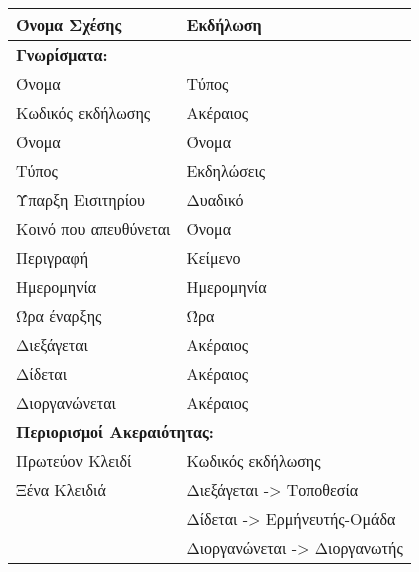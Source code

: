 \begin{tabular}{|p{6cm}|p{8cm}|}
  \hline
  Όνομα Σχέσης          & Εκδήλωση                         \\ \hline
  \multicolumn{2}{|l|}{\textbf{Γνωρίσματα:}}               \\ \hline
  Όνομα                 & Τύπος                            \\ \hline
  Κωδικός εκδήλωσης     & Ακέραιος                         \\ \hline
  Όνομα                 & Όνομα                            \\ \hline
  Τύπος                 & Εκδηλώσεις                       \\ \hline
  Ύπαρξη Εισιτηρίου     & Δυαδικό                          \\ \hline
  Κοινό που απευθύνεται & Όνομα                            \\ \hline
  Περιγραφή             & Κείμενο                          \\ \hline
  Ημερομηνία            & Ημερομηνία                       \\ \hline
  Ώρα έναρξης           & Ώρα                              \\ \hline
  Διεξάγεται            & Ακέραιος                         \\ \hline
  Δίδεται               & Ακέραιος                         \\ \hline
  Διοργανώνεται         & Ακέραιος                         \\ \hline
  \multicolumn{2}{|l|}{\textbf{Περιορισμοί Ακεραιότητας:}} \\ \hline
  Πρωτεύον Κλειδί       & Κωδικός εκδήλωσης                \\ \hline
  Ξένα Κλειδιά          & Διεξάγεται -> Τοποθεσία          \\ \cline{2-2}
                        & Δίδεται -> Ερμήνευτής-Ομάδα      \\ \cline{2-2}
                        & Διοργανώνεται -> Διοργανωτής     \\ \hline
\end{tabular}

